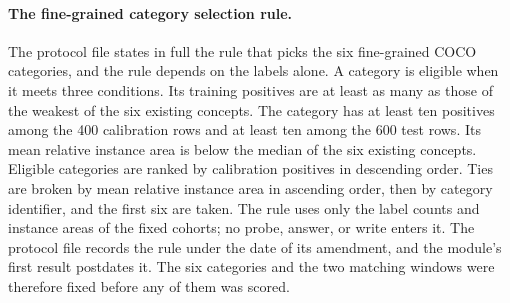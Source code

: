 \documentclass[11pt]{article}
\begin{document}
\FloatBarrier

\paragraph{The fine-grained category selection rule.} The protocol file states in full the rule that picks the six fine-grained COCO categories, and the rule depends on the labels alone. A category is eligible when it meets three conditions. Its training positives are at least as many as those of the weakest of the six existing concepts. The category has at least ten positives among the 400 calibration rows and at least ten among the 600 test rows. Its mean relative instance area is below the median of the six existing concepts. Eligible categories are ranked by calibration positives in descending order. Ties are broken by mean relative instance area in ascending order, then by category identifier, and the first six are taken. The rule uses only the label counts and instance areas of the fixed cohorts; no probe, answer, or write enters it. The protocol file records the rule under the date of its amendment, and the module's first result postdates it. The six categories and the two matching windows were therefore fixed before any of them was scored.
\end{document}
